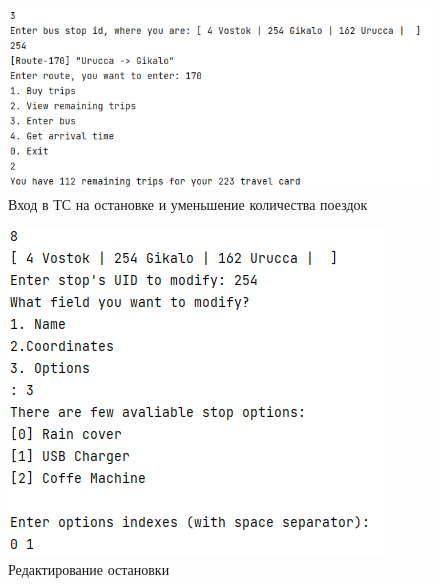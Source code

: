 \begin{figure}
    \centering
    \includegraphics{images/EnterBus_decrement.png}
    \caption{Вход в ТС на остановке и уменьшение количества поездок}
\end{figure}

\begin{figure}
    \centering
    \includegraphics{images/BusStopEdit.png}
    \caption{Редактирование остановки}
\end{figure}